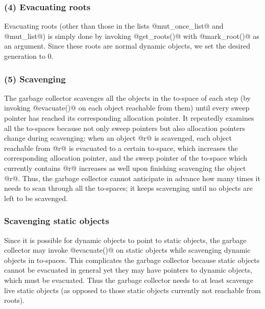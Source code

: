 \documentclass{article}
\begin{document}
\subsubsection{(4) Evacuating roots}

Evacuating roots (other than those in the lists @mut_once_list@ and 
@mut_list@) is simply done by invoking @get_roots()@ with @mark_root()@
as an argument. 
Since these roots are normal dynamic objects, we set the desired generation
to $0$.

\subsubsection{(5) Scavenging}

The garbage collector scavenges all the objects in the to-space of
each step (by invoking @evacuate()@ on each object reachable from them) 
until every sweep pointer has reached its corresponding 
allocation pointer. 
It repeatedly examines all the to-spaces because not only sweep pointers
but also allocation pointers change during scavenging:
when an object @r@ is scavenged, each object reachable from 
@r@ is evacuated to a certain to-space, which increases the corresponding
allocation pointer, and
the sweep pointer of the to-space which currently contains @r@
increases as well upon finishing scavenging the object @r@.
Thus, the garbage collector cannot anticipate in advance how many times 
it needs to scan through all the to-spaces; it keeps scavenging until
no objects are left to be scavenged.

\subsubsection{Scavenging static objects}

Since it is possible for dynamic objects to point to static objects,
the garbage collector may invoke @evacuate()@ on static objects 
while scavenging dynamic objects in to-spaces.
This complicates the garbage collector because 
static objects cannot be evacuated in general yet
they may have pointers to dynamic objects, which must be evacuated.
Thus the garbage collector needs to at least scavenge live static objects
(as opposed to those static objects currently not reachable from roots).
\end{document}
